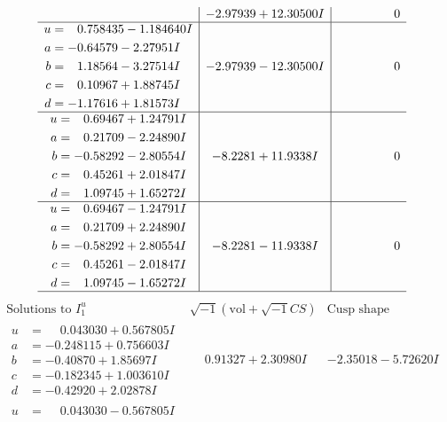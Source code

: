 \documentclass[1p]{elsarticle_modified}
\theoremstyle{definition}
\newcommand{\I}{\sqrt{-1}}
\begin{document}
$$\begin{array}{c|c|c}
 & -2.97939 + 12.30500 I & \phantom{-0.000000 } 0 \\ \hline\begin{aligned}
u &= \phantom{-}0.758435 - 1.184640 I \\
a &= -0.64579 - 2.27951 I \\
b &= \phantom{-}1.18564 - 3.27514 I \\
c &= \phantom{-}0.10967 + 1.88745 I \\
d &= -1.17616 + 1.81573 I\end{aligned}
 & -2.97939 - 12.30500 I & \phantom{-0.000000 } 0 \\ \hline\begin{aligned}
u &= \phantom{-}0.69467 + 1.24791 I \\
a &= \phantom{-}0.21709 - 2.24890 I \\
b &= -0.58292 - 2.80554 I \\
c &= \phantom{-}0.45261 + 2.01847 I \\
d &= \phantom{-}1.09745 + 1.65272 I\end{aligned}
 & -8.2281 + 11.9338 I & \phantom{-0.000000 } 0 \\ \hline\begin{aligned}
u &= \phantom{-}0.69467 - 1.24791 I \\
a &= \phantom{-}0.21709 + 2.24890 I \\
b &= -0.58292 + 2.80554 I \\
c &= \phantom{-}0.45261 - 2.01847 I \\
d &= \phantom{-}1.09745 - 1.65272 I\end{aligned}
 & -8.2281 - 11.9338 I & \phantom{-0.000000 } 0\\
 \hline 
 \end{array}$$\newpage$$\begin{array}{c|c|c}  
\text{Solutions to }I^u_{1}& \I (\text{vol} + \sqrt{-1}CS) & \text{Cusp shape}\\
 \hline 
\begin{aligned}
u &= \phantom{-}0.043030 + 0.567805 I \\
a &= -0.248115 + 0.756603 I \\
b &= -0.40870 + 1.85697 I \\
c &= -0.182345 + 1.003610 I \\
d &= -0.42920 + 2.02878 I\end{aligned}
 & \phantom{-}0.91327 + 2.30980 I & -2.35018 - 5.72620 I \\ \hline\begin{aligned}
u &= \phantom{-}0.043030 - 0.567805 I \\

\end{aligned}
\end{array}$$
\end{document}
